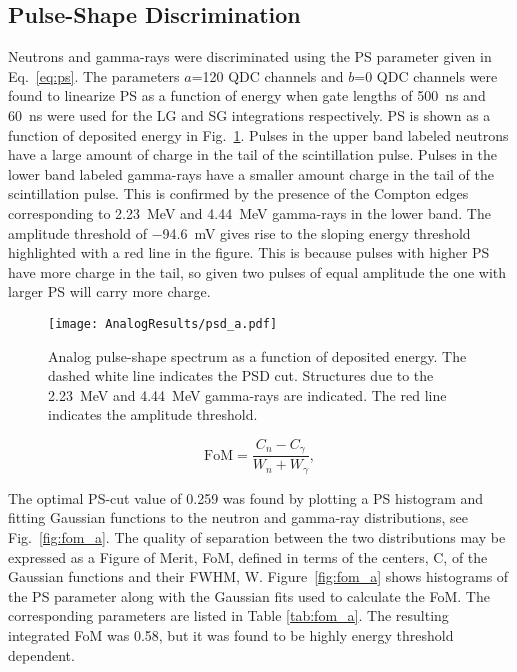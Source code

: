 \documentclass[main.tex]{subfiles}
\begin{document}
\subsection{Pulse-Shape Discrimination}
Neutrons and gamma-rays were discriminated using the PS parameter given in Eq.~\ref{eq:ps}. The parameters $a$=120 QDC channels and $b$=0 QDC channels were found to linearize PS as a function of energy when gate lengths of \SI{500}{\ns} and \SI{60}{ns} were used for the LG and SG integrations respectively.
PS is shown as a function of deposited energy in Fig.~\ref{fig:psd_a}. Pulses in the upper band labeled neutrons have a large amount of charge in the tail of the scintillation pulse. Pulses in the lower band labeled gamma-rays have a smaller amount charge in the tail of the scintillation pulse. 
This is confirmed by the presence of the Compton edges corresponding to \SI{2.23}{MeV} and \SI{4.44}{MeV} gamma-rays in the lower band. The amplitude threshold of \SI{-94.6}{mV} gives rise to the sloping energy threshold highlighted with a red line in the figure. This is because pulses with higher PS  have more charge in the tail, so given two pulses of equal amplitude the one with larger PS will carry more charge.
\begin{figure}[ht]
    \centering
        \texttt{[image: AnalogResults/psd\_a.pdf]}
        \caption[Analog pulse-shape spectrum as a function of deposited energy.]{Analog pulse-shape spectrum as a function of deposited energy. The dashed white line indicates the PSD cut. Structures due to the \SI{2.23}{MeV} and \SI{4.44}{MeV} gamma-rays are indicated. The red line indicates the amplitude threshold.}
        \label{fig:psd_a}
\end{figure}

\begin{equation}
\textrm{FoM} = \frac{C_n - C_\gamma}{W_n + W_\gamma},
\end{equation}

The optimal PS-cut value of 0.259 was found by plotting a PS histogram and fitting Gaussian functions to the neutron and gamma-ray distributions, see Fig.~\ref{fig:fom_a}. The quality of separation between the two distributions may be expressed as a Figure of Merit, FoM, defined in terms of the centers, C, of the Gaussian functions and their FWHM, W. Figure~\ref{fig:fom_a} shows histograms of the PS parameter along with the Gaussian fits used to calculate the FoM. The corresponding parameters are listed in Table \ref{tab:fom_a}. The resulting integrated FoM was 0.58, but it was found to be highly energy threshold dependent. 
\end{document}
